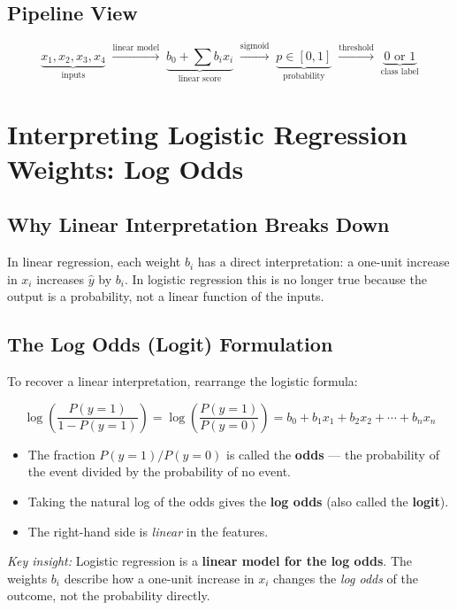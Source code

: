 \documentclass[11pt]{article}
\begin{document}
\subsection{Pipeline View}
\[
\underbrace{x_1, x_2, x_3, x_4}_{\text{inputs}}
\;\xrightarrow{\text{linear model}}\;
\underbrace{b_0 + \sum b_i x_i}_{\text{linear score}}
\;\xrightarrow{\text{sigmoid}}\;
\underbrace{p \in [0,1]}_{\text{probability}}
\;\xrightarrow{\text{threshold}}\;
\underbrace{0 \text{ or } 1}_{\text{class label}}
\]


\newpage
\section{Interpreting Logistic Regression Weights: Log Odds}

\subsection{Why Linear Interpretation Breaks Down}
In linear regression, each weight $b_i$ has a direct interpretation: a
one-unit increase in $x_i$ increases $\hat{y}$ by $b_i$. In logistic
regression this is no longer true because the output is a probability,
not a linear function of the inputs.

\subsection{The Log Odds (Logit) Formulation}
To recover a linear interpretation, rearrange the logistic formula:

\[
\log\!\left(\frac{P(y=1)}{1 - P(y=1)}\right)
= \log\!\left(\frac{P(y=1)}{P(y=0)}\right)
= b_0 + b_1 x_1 + b_2 x_2 + \cdots + b_n x_n
\]

\begin{itemize}
    \item The fraction $P(y=1)/P(y=0)$ is called the \textbf{odds} ---
      the probability of the event divided by the probability of no event.
    \item Taking the natural log of the odds gives the \textbf{log odds}
      (also called the \textbf{logit}).
    \item The right-hand side is \emph{linear} in the features.
\end{itemize}

\textit{Key insight:} Logistic regression is a \textbf{linear model for the
log odds}. The weights $b_i$ describe how a one-unit increase in $x_i$
changes the \emph{log odds} of the outcome, not the probability directly.
\end{document}
